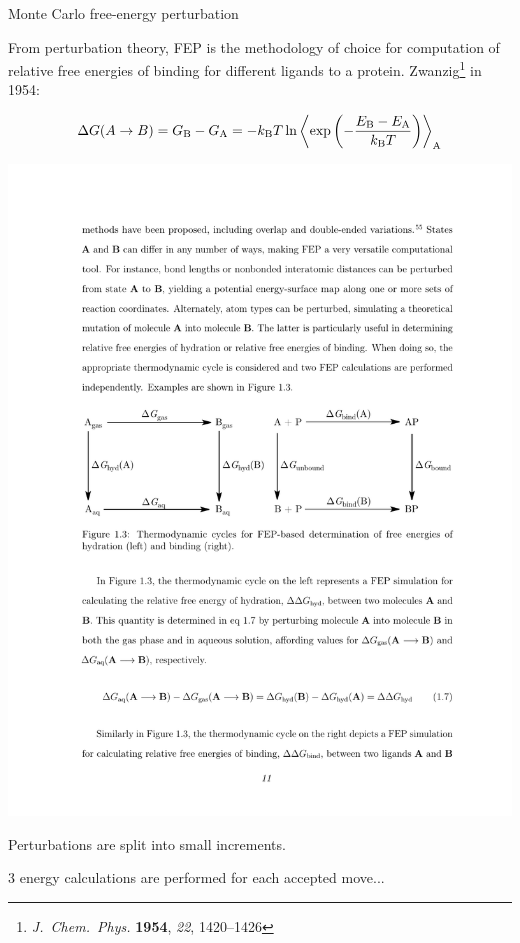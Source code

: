 \documentclass[10pt]{beamer}
\begin{document}
\begin{frame}[t]{Monte Carlo free-energy perturbation}

From perturbation theory, FEP is the methodology of choice for computation of relative free energies of binding for different ligands to a protein. Zwanzig\footnote{\textit{J.\ Chem.\ Phys.} \textbf{1954}, \textit{22}, 1420--1426} in 1954:

\begin{equation*}
\Delta G(A \rightarrow B) = G_\textnormal{B} - G_\textnormal{A} = -k_\textnormal{B}T\ln\left\langle\exp\left(-\frac{E_\textnormal{B}-E_\textnormal{A}}{k_\textnormal{B}T}\right)\right\rangle_{\textnormal{A}}
\end{equation*}

\begin{center}
\includegraphics[scale=0.7]{figures/cycle.pdf}
\end{center}

Perturbations are split into small increments.

3 energy calculations are performed for each accepted move...

\end{frame}
\end{document}
